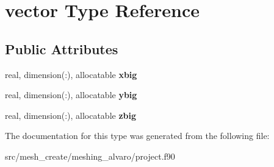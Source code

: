 \hypertarget{structvector}{}\section{vector Type Reference}
\label{structvector}
\subsection*{Public Attributes}
\begin{DoxyCompactItemize}
\item 
\mbox{\label{structvector_a73717a74d5dd2127f3065157727d4bcf}} 
real, dimension(\+:), allocatable {\bfseries xbig}
\item 
\mbox{\label{structvector_ab2792b9a90e1bdc46e7c6756896be0ad}} 
real, dimension(\+:), allocatable {\bfseries ybig}
\item 
\mbox{\label{structvector_a840894dad104c678a2c86d908e0497a3}} 
real, dimension(\+:), allocatable {\bfseries zbig}
\end{DoxyCompactItemize}


The documentation for this type was generated from the following file\+:\begin{DoxyCompactItemize}
\item 
src/mesh\+\_\+create/meshing\+\_\+alvaro/project.\+f90\end{DoxyCompactItemize}
